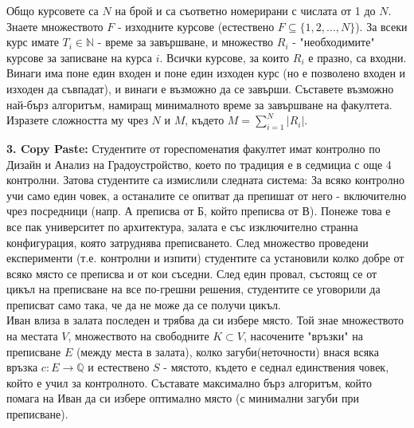 \documentclass[fleqn,12pt]{article}
\begin{document}
\begin{flushleft}
Общо курсовете са $N$ на брой и са съответно номерирани с числата от 1 до $N$. Знаете множеството $F$ - изходните курсове (естествено $F \subseteq \{1,2, \dots, N\}$). За всеки курс имате $T_i \in \mathbb{N}$ - време за завършване, и множество $R_i$ - "необходимите" курсове за записване на курса $i$. Всички курсове, за които $R_i$ е празно, са входни. Винаги има поне един входен и поне един изходен курс (но е позволено входен и изходен да съвпадат), и винаги е възможно да се завърши. Съставете възможно най-бърз алгоритъм, намиращ минималното време за завършване на факултета. Изразете сложността му чрез $N$ и $M$, където $M = \sum_{i=1}^N |R_i|$.

\vspace{10mm}

\textbf{3. Copy Paste:} Студентите от гореспоменатия факултет имат контролно по Дизайн и Анализ на Градоустройство, което по традиция е в седмициа с още 4 контролни. Затова студентите са измислили следната система: За всяко контролно учи само един човек, а останалите се опитват да препишат от него - включително чрез посредници (напр. А преписва от Б, който преписва от В). Понеже това е все пак университет по архитектура, залата е със изключително странна конфигурация, която затруднява преписването. След множество проведени експерименти (т.е. контролни и изпити) студентите са установили колко добре от всяко място се преписва и от кои съседни. След един провал, състоящ се от цикъл на преписване на все по-грешни решения, студентите се уговорили да преписват само така, че да не може да се получи цикъл. \\
\qquad Иван влиза в залата последен и трябва да си избере място. Той знае множеството на местата $V$, множеството на свободните $K \subset V$, насочените "връзки" на преписване $E$ (между места в залата), колко загуби(неточности) внася всяка връзка $c : E \rightarrow \mathbb{Q} $ и естествено $S$ - мястото, където е седнал единствения човек, който е учил за контролното. Съставате максимално бърз алгоритъм, който помага на Иван да си избере оптимално място (с минимални загуби при преписване).

\end{flushleft}
\end{document}
